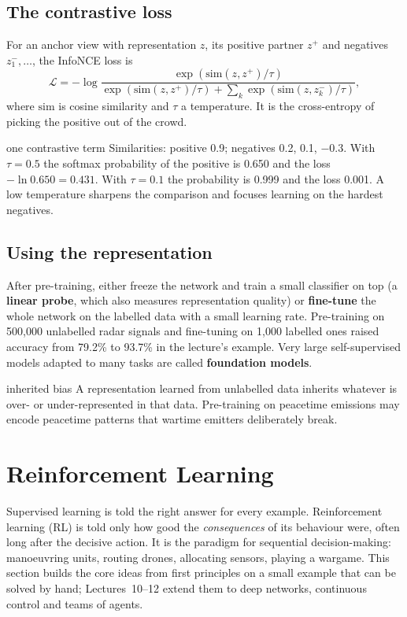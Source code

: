 \documentclass[11pt]{article}
\begin{document}
\subsection{The contrastive loss}
For an anchor view with representation $z$, its positive partner $z^+$ and negatives $z_1^-,\ldots$, the InfoNCE loss is
\[\mathcal L=-\log\frac{\exp(\mathrm{sim}(z,z^+)/\tau)}{\exp(\mathrm{sim}(z,z^+)/\tau)+\sum_k\exp(\mathrm{sim}(z,z_k^-)/\tau)},\]
where $\mathrm{sim}$ is cosine similarity and $\tau$ a temperature. It is the cross-entropy of picking the positive out of the crowd.
\begin{example}{one contrastive term}
Similarities: positive 0.9; negatives 0.2, 0.1, $-0.3$. With $\tau=0.5$ the softmax probability of the positive is 0.650 and the loss $-\ln0.650=0.431$. With $\tau=0.1$ the probability is 0.999 and the loss 0.001. A low temperature sharpens the comparison and focuses learning on the hardest negatives.
\end{example}
\subsection{Using the representation}
After pre-training, either freeze the network and train a small classifier on top (a \textbf{linear probe}, which also measures representation quality) or \textbf{fine-tune} the whole network on the labelled data with a small learning rate. Pre-training on 500,000 unlabelled radar signals and fine-tuning on 1,000 labelled ones raised accuracy from 79.2\% to 93.7\% in the lecture's example. Very large self-supervised models adapted to many tasks are called \textbf{foundation models}.
\begin{pitfall}{inherited bias}
A representation learned from unlabelled data inherits whatever is over- or under-represented in that data. Pre-training on peacetime emissions may encode peacetime patterns that wartime emitters deliberately break.
\end{pitfall}

\section{Reinforcement Learning}
\label{sec:rl}
Supervised learning is told the right answer for every example. Reinforcement learning (RL) is told only how good the \emph{consequences} of its behaviour were, often long after the decisive action. It is the paradigm for sequential decision-making: manoeuvring units, routing drones, allocating sensors, playing a wargame. This section builds the core ideas from first principles on a small example that can be solved by hand; Lectures~10--12 extend them to deep networks, continuous control and teams of agents.
\end{document}
